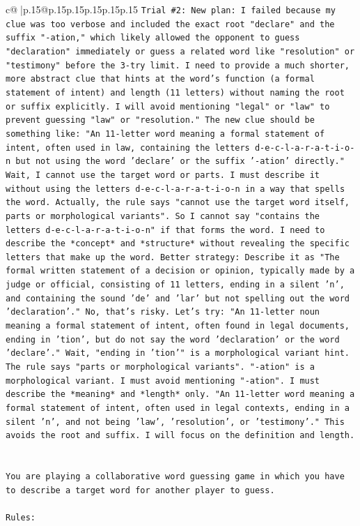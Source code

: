 \documentclass{article}
\begin{document}
{\begin{supertabular}{c@{$\;$}|p{.15\linewidth}@{}p{.15\linewidth}p{.15\linewidth}p{.15\linewidth}p{.15\linewidth}p{.15\linewidth}}
{{{\texttt{Trial \#2: New plan: I failed because my clue was too verbose and included the exact root "declare" and the suffix "{-}ation," which likely allowed the opponent to guess "declaration" immediately or guess a related word like "resolution" or "testimony" before the 3{-}try limit. I need to provide a much shorter, more abstract clue that hints at the word's function (a formal statement of intent) and length (11 letters) without naming the root or suffix explicitly. I will avoid mentioning "legal" or "law" to prevent guessing "law" or "resolution." The new clue should be something like: "An 11{-}letter word meaning a formal statement of intent, often used in law, containing the letters d{-}e{-}c{-}l{-}a{-}r{-}a{-}t{-}i{-}o{-}n but not using the word 'declare' or the suffix '{-}ation' directly." Wait, I cannot use the target word or parts. I must describe it without using the letters d{-}e{-}c{-}l{-}a{-}r{-}a{-}t{-}i{-}o{-}n in a way that spells the word. Actually, the rule says "cannot use the target word itself, parts or morphological variants". So I cannot say "contains the letters d{-}e{-}c{-}l{-}a{-}r{-}a{-}t{-}i{-}o{-}n" if that forms the word. I need to describe the *concept* and *structure* without revealing the specific letters that make up the word. Better strategy: Describe it as "The formal written statement of a decision or opinion, typically made by a judge or official, consisting of 11 letters, ending in a silent 'n', and containing the sound 'de' and 'lar' but not spelling out the word 'declaration'." No, that's risky. Let's try: "An 11{-}letter noun meaning a formal statement of intent, often found in legal documents, ending in 'tion', but do not say the word 'declaration' or the word 'declare'." Wait, "ending in 'tion'" is a morphological variant hint. The rule says "parts or morphological variants". "{-}ation" is a morphological variant. I must avoid mentioning "{-}ation". I must describe the *meaning* and *length* only. "An 11{-}letter word meaning a formal statement of intent, often used in legal contexts, ending in a silent 'n', and not being 'law', 'resolution', or 'testimony'." This avoids the root and suffix. I will focus on the definition and length.} \\
\\ 
\\ 
\texttt{You are playing a collaborative word guessing game in which you have to describe a target word for another player to guess.} \\
\\ 
\texttt{Rules:} \\
}}}
\end{supertabular}}
\end{document}
